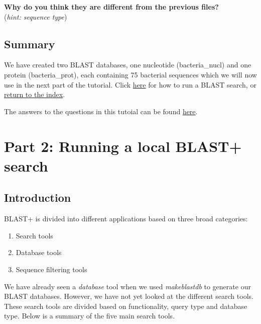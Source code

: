 \documentclass[11pt]{article}
\providecommand{\tightlist}{%
      \setlength{\itemsep}{0pt}\setlength{\parskip}{0pt}}
\begin{document}
\textbf{Why do you think they are different from the previous files?}\\
(\textit{hint: sequence type})

    \hypertarget{summary}{%
\subsection{Summary}\label{summary}}

We have created two BLAST databases, one nucleotide (bacteria\_nucl) and
one protein (bacteria\_prot), each containing 75 bacterial sequences
which we will now use in the next part of the tutorial. Click
\href{run_blast.ipynb}{here} for how to run a BLAST search, or
\href{index.ipynb}{return to the index}.

The answers to the questions in this tutoial can be found
\href{general_question_and_exercise_answers.ipynb}{here}.





\newpage






    \hypertarget{part-2-running-a-local-blast-search}{%
\section{Part 2: Running a local BLAST+
search}\label{part-2-running-a-local-blast-search}}

    \hypertarget{introduction}{%
\subsection{Introduction}\label{introduction}}

BLAST+ is divided into different applications based on three broad
categories:

\begin{enumerate}
\def\labelenumi{\arabic{enumi}.}
\tightlist
\item
  Search tools
\item
  Database tools
\item
  Sequence filtering tools
\end{enumerate}

We have already seen a \textit{database} tool when we used
\textit{makeblastdb} to generate our BLAST databases. However, we have not
yet looked at the different search tools. These search tools are divided
based on functionality, query type and database type. Below is a summary
of the five main search tools.
\end{document}
